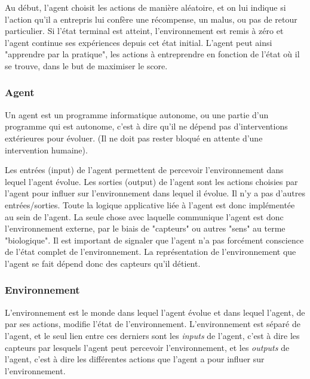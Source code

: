 \documentclass[11pt,a4paper]{report}
\begin{document}
    \par Au début, l'agent choisit les actions de manière aléatoire, et on lui indique si l'action qu'il a entrepris lui confère une récompense, un malus, ou pas de retour particulier. Si l'état terminal est atteint, l'environnement est remis à zéro et l'agent continue ses expériences depuis cet état initial. L'agent peut ainsi "apprendre par la pratique", les actions à entreprendre en fonction de l'état où il se trouve, dans le but de maximiser le score.
  
  \subsubsection{Agent}
  
    \par Un agent est un programme informatique autonome, ou une partie d'un programme qui est autonome, c'est à dire qu'il ne dépend pas d'interventions extérieures pour évoluer. (Il ne doit pas rester bloqué en attente d'une intervention humaine). 
    
    \par Les entrées (input) de l'agent permettent de percevoir l'environnement dans lequel l'agent évolue. Les sorties (output) de l'agent sont les actions choisies par l'agent pour influer sur l'environnement dans lequel il évolue. Il n'y a pas d'autres entrées/sorties. Toute la logique applicative liée à l'agent est donc implémentée au sein de l'agent. La seule chose avec laquelle communique l'agent est donc l'environnement externe, par le biais de "capteurs" ou autres "sens" au terme "biologique". Il est important de signaler que l'agent n'a pas forcément conscience de l'état complet de l'environnement. La représentation de l'environnement que l'agent se fait dépend donc des capteurs qu'il détient. 
   
  \subsubsection{Environnement}
  
    \par L'environnement est le monde dans lequel l'agent évolue et dans lequel l'agent, de par ses actions, modifie l'état de l'environnement. L'environnement est séparé de l'agent, et le seul lien entre ces derniers sont les \textit{inputs} de l'agent, c'est à dire les capteurs par lesquels l'agent peut percevoir l'environnement, et les \textit{outputs} de l'agent, c'est à dire les différentes actions que l'agent a pour influer sur l'environnement. 
    
\end{document}
